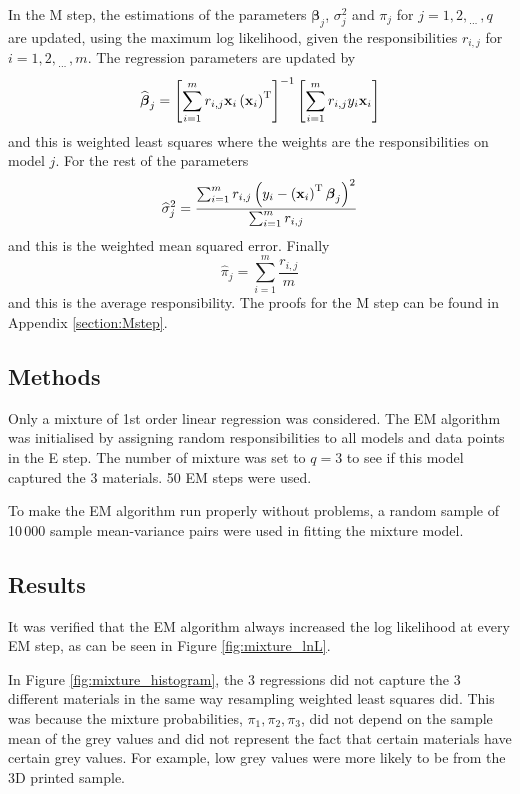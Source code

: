 \documentclass[12pt]{report}
\newcommand{\T}{^\textup{T}}
\newcommand{\dotdotdot}{_{\phantom{.}\cdots}}
\newcommand{\vect}[1]{\mathbf{#1}}
\newcommand{\vectGreek}[1]{\boldsymbol{#1}}
\begin{document}
In the M step, the estimations of the  parameters $\vectGreek{\beta}_j$, $\sigma_j^2$ and $\pi_j$ for $j=1,2,\dotdotdot,q$ are updated, using the maximum log likelihood, given the responsibilities $r_{i,j}$ for $i=1,2,\dotdotdot,m$. The regression parameters are updated by
\begin{equation}
\widehat{\vectGreek{\beta}}_j
=
\left[\sum_{i=1}^{m}r_{i,j}
\vect{x}_i\left(\vect{x}_i\right)\T\right]^{-1}
\left[\sum_{i=1}^{m}
r_{i,j}
y_i\vect{x}_i\right]
\end{equation}
and this is weighted least squares where the weights are the responsibilities on model $j$. For the rest of the parameters
\begin{equation}
\widehat{\sigma}_j^2
=
\frac{\sum_{i=1}^{m}
r_{i,j}\left({y_i-\left(\vect{x}_i\right)\T\vectGreek{\beta}_j}\right)^2}
{\sum_{i=1}^{m}r_{i,j}}
\end{equation}
and this is the weighted mean squared error.  Finally
\begin{equation}
\widehat{\pi}_j = \sum_{i=1}^m\frac{r_{i,j}}{m}
\end{equation}
and this is the average responsibility. The proofs for the M step can be found in Appendix \ref{section:Mstep}.

\subsection{Methods}

Only a mixture of 1st order linear regression was considered. The EM algorithm was initialised by assigning random responsibilities to all models and data points in the E step. The number of mixture was set to $q=3$ to see if this model captured the 3 materials. 50 EM steps were used.

To make the EM algorithm run properly without problems, a random sample of 10\,000 sample mean-variance pairs were used in fitting the mixture model.

\subsection{Results}
It was verified that the EM algorithm always increased the log likelihood at every EM step, as can be seen in Figure \ref{fig:mixture_lnL}.

In Figure \ref{fig:mixture_histogram}, the 3 regressions did not capture the 3 different materials in the same way resampling weighted least squares did. This was because the mixture probabilities, $\pi_1,\pi_2,\pi_3$, did not depend on the sample mean of the grey values and did not represent the fact that certain materials have certain grey values. For example, low grey values were more likely to be from the 3D printed sample.
\end{document}
